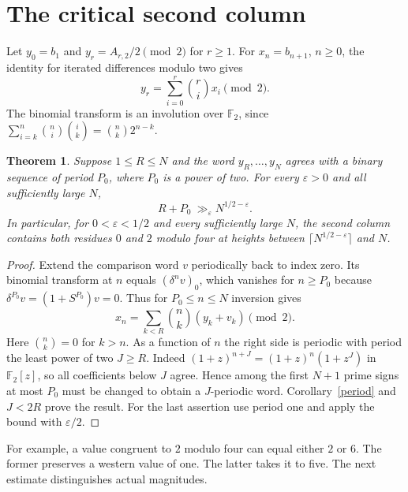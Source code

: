 \documentclass[11pt,a4paper]{article}
\newtheorem{theorem}{Theorem}
\newcommand{\F}{\mathbb F_2}
\newcommand{\eps}{\varepsilon}
\begin{document}
\section{The critical second column}
Let $y_0=b_1$ and $y_r=A_{r,2}/2\pmod 2$ for $r\ge1$. For $x_n=b_{n+1}$, $n\ge0$, the identity for iterated differences modulo two gives
\[
 y_r=\sum_{i=0}^r\binom ri x_i\pmod2.
\]
The binomial transform is an involution over $\F$, since
$\sum_{i=k}^n\binom ni\binom ik=\binom nk2^{n-k}$.
\begin{theorem}\label{ray}
Suppose $1\le R\le N$ and the word $y_R,\ldots,y_N$ agrees with a binary sequence of period $P_0$, where $P_0$ is a power of two. For every $\eps>0$ and all sufficiently large $N$,
\[
                      R+P_0\ \gg_\eps N^{1/2-\eps}.
\]
In particular, for $0<\eps<1/2$ and every sufficiently large $N$, the second column contains both residues $0$ and $2$ modulo four at heights between $\lceil N^{1/2-\eps}\rceil$ and $N$.
\end{theorem}
\begin{proof}
Extend the comparison word $v$ periodically back to index zero. Its binomial transform at $n$ equals $(\delta^n v)_0$, which vanishes for $n\ge P_0$ because $\delta^{P_0}v=(1+S^{P_0})v=0$. Thus for $P_0\le n\le N$ inversion gives
\[
 x_n=\sum_{k<R}\binom nk(y_k+v_k)\pmod2 .
\]
Here $\binom nk=0$ for $k>n$. As a function of $n$ the right side is periodic with period the least power of two $J\ge R$. Indeed $(1+z)^{n+J}=(1+z)^n(1+z^J)$ in $\F[z]$, so all coefficients below $J$ agree. Hence among the first $N+1$ prime signs at most $P_0$ must be changed to obtain a $J$-periodic word. Corollary~\ref{period} and $J<2R$ prove the result. For the last assertion use period one and apply the bound with $\eps/2$.
\end{proof}
For example, a value congruent to $2$ modulo four can equal either $2$ or $6$. The former preserves a western value of one. The latter takes it to five. The next estimate distinguishes actual magnitudes.
\newpage
\end{document}
